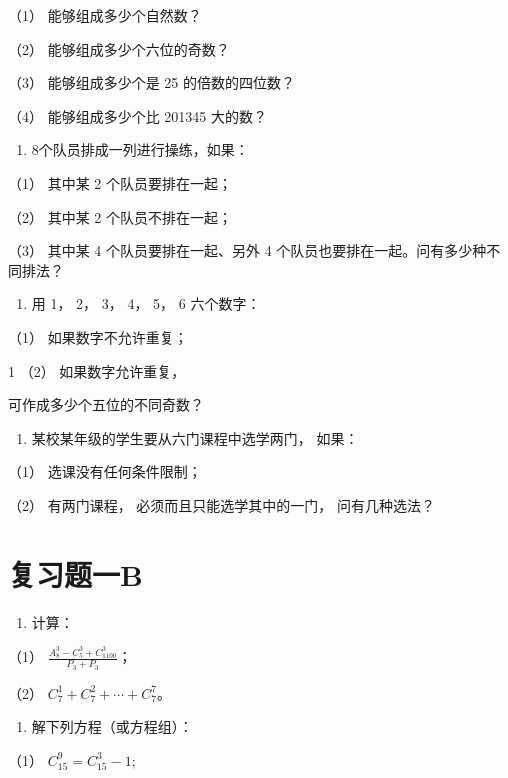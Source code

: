 （1） 能够组成多少个自然数？

（2） 能够组成多少个六位的奇数？

（3） 能够组成多少个是 25 的倍数的四位数？

（4） 能够组成多少个比 201345 大的数？

\begin{enumerate}[start=4]
\item
  8个队员排成一列进行操练，如果：
\end{enumerate}

（1） 其中某 2 个队员要排在一起；

（2） 其中某 2 个队员不排在一起；

（3） 其中某 4 个队员要排在一起、另外 4
个队员也要排在一起。问有多少种不同排法？

\begin{enumerate}[start=5]
\item
  用 1， 2， 3， 4， 5， 6 六个数字：
\end{enumerate}

（1） 如果数字不允许重复；

1 （2） 如果数字允许重复，

可作成多少个五位的不同奇数？

\begin{enumerate}[start=6]
\item
  某校某年级的学生要从六门课程中选学两门， 如果：
\end{enumerate}

（1） 选课没有任何条件限制；

（2） 有两门课程， 必须而且只能选学其中的一门， 问有几种选法？

\section{复习题一B}

\begin{enumerate}
\item
  计算：
\end{enumerate}

（1） \(\frac{A_8^3 - C_5^3 + C_{1100}^3}{P_3 + P_3}\)；

（2） \(C_7^1 + C_7^2 + \cdots + C_7^7\)。

\begin{enumerate}[start=2]
\item
  解下列方程（或方程组）：
\end{enumerate}

（1） \(C_{15}^{9} = C_{15}^{3} - 1;\)

